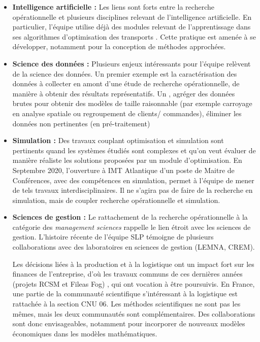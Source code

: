 	
	\begin{itemize}
	    \item \textbf{Intelligence artificielle :} 
	    Les liens sont forts entre la recherche opérationnelle et plusieurs disciplines relevant de l'intelligence artificielle. 
	    En particulier, l'équipe utilise déjà des modules relevant de l'apprentissage dans ses algorithmes d'optimisation des transports . 
	    Cette pratique est amenée à se développer, notamment pour la conception de  méthodes approchées. 
	    
	    \item \textbf{Science des données : } 	   
	    Plusieurs enjeux intéressants pour l'équipe \slp relèvent de la science des données. Un premier exemple est la caractérisation des données à collecter en amont d'une étude de recherche opérationnelle, de manière à obtenir des résultats représentatifs. Un  , agréger des données brutes pour obtenir des modèles de taille raisonnable (par exemple carroyage en analyse spatiale ou regroupement de clients/ commandes), éliminer les données non pertinentes (en pré-traitement)
	        
    \item \textbf{Simulation : } 
	    Des travaux couplant optimisation et simulation sont pertinents quand les systèmes étudiés sont complexes et qu'on veut évaluer de manière réaliste les solutions proposées par un module d'optimisation. En Septembre 2020, l'ouverture à IMT Atlantique d'un poste de Maitre de Conférences, avec des compétences en simulation, 
	    permet à l'équipe de mener de tels travaux interdisciplinaires. Il ne s'agira pas de faire de la recherche en simulation, mais de coupler recherche opérationnelle et simulation.
	    
\item \textbf{Sciences de gestion : }
	     Le rattachement de la recherche opérationnelle à la catégorie des \textit{management sciences} rappelle le lien étroit avec les sciences de gestion. L'histoire récente de l'équipe SLP témoigne de plusieurs collaborations avec des laboratoires en sciences de gestion (LEMNA, CREM). 
	    
	   Les décisions liées à la production et à la logistique ont un impact fort sur les finances de l'entreprise, d'où les travaux communs de ces dernières années (projets RCSM et Fileas Fog) , qui ont vocation à être poursuivis. En France, une partie de la communauté scientifique s'intéressant à la logistique est rattachée à la section CNU 06. Les méthodes scientifiques ne sont pas les mêmes, mais les deux communautés sont complémentaires. Des collaborations sont donc envisageables, notamment pour incorporer de nouveaux modèles économiques dans les modèles mathématiques. 
	   

\end{itemize}
